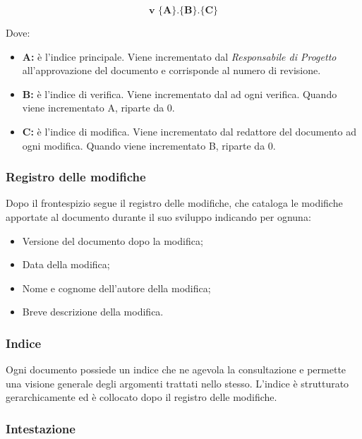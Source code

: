 \documentclass[../NormediProgetto.tex]{subfiles}
\begin{document}
\[\textbf{v $\biggl\{$A$\biggr\}$.$\biggl\{$B$\biggr\}$.$\biggl\{$C$\biggr\}$}\]

Dove:

\begin{itemize}
	\item{\textbf{A:}} è l'indice principale. Viene incrementato dal \textit{Responsabile di Progetto} all’approvazione del documento e 
	corrisponde al numero di revisione.
	\item{\textbf{B:}} è l'indice di verifica. Viene incrementato dal  ad ogni verifica. Quando viene incrementato A, riparte da 0.
	\item{\textbf{C:}} è l'indice di modifica. Viene incrementato dal redattore del documento ad ogni modifica. Quando viene incrementato B, riparte da 0.
\end{itemize}

\subsubsection{Registro delle modifiche}

Dopo il frontespizio segue il registro delle modifiche, che cataloga le modifiche apportate al documento durante il suo sviluppo indicando per ognuna:

\begin{itemize}
	\item Versione del documento dopo la modifica;
	\item Data della modifica;
	\item Nome e cognome dell'autore della modifica;
	\item Breve descrizione della modifica.
\end{itemize}

\subsubsection{Indice}

Ogni documento possiede un indice che ne agevola la consultazione e permette una visione generale degli argomenti trattati nello stesso. L'indice è strutturato gerarchicamente ed è collocato dopo il registro delle modifiche.

\subsubsection{Intestazione}
\end{document}
